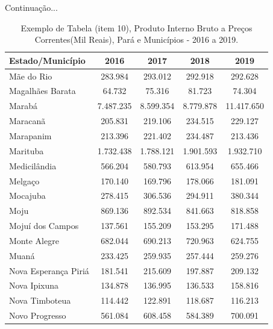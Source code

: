 \newpage
\begin{table}[!htb]
    \centering
    {
    \caption{Exemplo de Tabela (item 10), Produto Interno Bruto a Preços Correntes(Mil Reais), Pará e Municípios - 2016 a 2019.}  Continuação...
    \label{item 10 regras3}
    \vspace{0.1cm}
\begin{tabular}{l|c|c|c|c}
  \hline\hline
  Estado/Município        &    2016    &    2017    &  2018      &  2019    \\
  \hline\hline
   Mãe do Rio             &  283.984   &  293.012   &  292.918   & 292.628   \\
   Magalhães Barata       &  64.732    &  75.316    &  81.723    & 74.304    \\
   Marabá                 &  7.487.235 &  8.599.354 &  8.779.878 & 11.417.650 \\
   Maracanã               & 205.831    &  219.106   &  234.515   & 229.127    \\ 
   Marapanim              & 213.396    &  221.402   &  234.487   & 213.436    \\
   Marituba               & 1.732.438  & 1.788.121  &  1.901.593 &  1.932.710  \\
   Medicilândia           & 566.204    & 580.793    &  613.954   &  655.466    \\
   Melgaço                & 170.140    & 169.796    &  178.066   &  181.091     \\
   Mocajuba               & 278.415    & 306.536    &  294.911   &   380.344     \\
   Moju                   & 869.136    & 892.534    & 841.663    & 818.858      \\
   Mojuí dos Campos       & 137.561    & 155.209    & 153.295    & 171.488      \\
   Monte Alegre           & 682.044    & 690.213    & 720.963    & 624.755      \\
   Muaná                  & 233.425    &  259.935   & 257.444    &  259.276     \\
   Nova Esperança Piriá   & 181.541    &  215.609   & 197.887    &  209.132     \\
   Nova Ipixuna           & 134.878    &  136.995   & 136.533    &  158.816    \\
   Nova Timboteua         & 114.442    &  122.891   & 118.687    & 116.213     \\
   Novo Progresso         & 561.084    &  608.458   & 584.389    & 700.091      \\

\end{tabular}}
\end{table}
